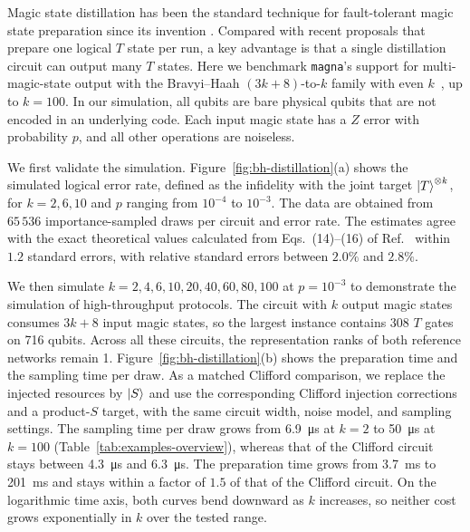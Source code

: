 \documentclass[aps,prx,twocolumn,superscriptaddress,longbibliography]{revtex4-2}
\newcommand{\simname}{\texttt{magna}}
\begin{document}
Magic state distillation has been the standard technique for fault-tolerant magic state preparation
since its invention \cite{bravyiUniversalQuantumComputation2005}.
Compared with recent proposals that prepare one logical $T$ state per run,
a key advantage is that a single distillation circuit can output many $T$ states.
Here we benchmark \simname's support for multi-magic-state output with the Bravyi--Haah
$(3k+8)$-to-$k$ family with even $k$~\cite{bravyiMagicStateDistillation2012},
up to $k = 100$.
In our simulation, all qubits are bare physical qubits that are not encoded in an underlying code.
Each input magic state has a $Z$ error with probability $p$,
and all other operations are noiseless.

We first validate the simulation.
Figure~\ref{fig:bh-distillation}(a) shows the simulated logical error rate,
defined as the infidelity with the joint target $\ket{T}^{\otimes k}$, for $k = 2,6,10$
and $p$ ranging from $10^{-4}$ to $10^{-3}$.
The data are obtained from $65\,536$ importance-sampled draws per circuit and error rate.
The estimates agree with the exact theoretical values
calculated from Eqs.~(14)--(16) of Ref.~\cite{bravyiMagicStateDistillation2012}
within $1.2$ standard errors, with relative standard errors between $2.0\%$ and $2.8\%$.

We then simulate $k = 2,4,6,10,20,40,60,80,100$ at $p = 10^{-3}$
to demonstrate the simulation of high-throughput protocols.
The circuit with $k$ output magic states consumes $3k+8$ input magic states,
so the largest instance contains 308 $T$ gates on 716 qubits.
Across all these circuits, the representation ranks of both reference networks remain 1.
Figure~\ref{fig:bh-distillation}(b) shows the preparation time and the sampling time per draw.
As a matched Clifford comparison, we replace the injected resources by $\ket S$
and use the corresponding Clifford injection corrections and a product-$S$ target,
with the same circuit width, noise model, and sampling settings.
The sampling time per draw grows from \qty{6.9}{\micro\second} at $k=2$ to \qty{50}{\micro\second} at $k=100$
(Table~\ref{tab:examples-overview}),
whereas that of the Clifford circuit stays between \qty{4.3}{\micro\second} and \qty{6.3}{\micro\second}.
The preparation time grows from \qty{3.7}{\milli\second} to \qty{201}{\milli\second}
and stays within a factor of $1.5$ of that of the Clifford circuit.
On the logarithmic time axis, both curves bend downward as $k$ increases,
so neither cost grows exponentially in $k$ over the tested range.
\end{document}
